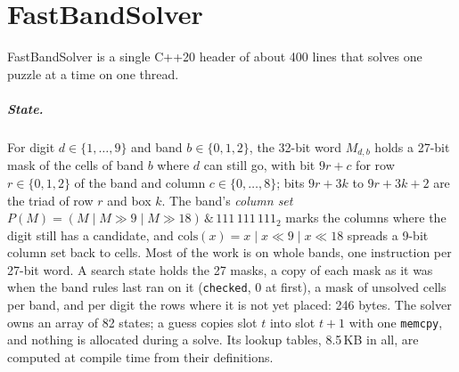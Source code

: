 \documentclass[a4paper,USenglish,cleveref,anonymous]{lipics-v2021}
\begin{document}
\section{FastBandSolver}
\label{sec:solver}

FastBandSolver is a single C++20 header of about 400 lines that solves one puzzle at a time on one thread.

\subparagraph{State.} For digit $d\in\{1,\dots,9\}$ and band $b\in\{0,1,2\}$, the 32-bit word $M_{d,b}$ holds a 27-bit
mask of the cells of band $b$ where $d$ can still go, with bit $9r+c$ for row $r\in\{0,1,2\}$ of the band and column
$c\in\{0,\dots,8\}$; bits $9r+3k$ to $9r+3k+2$ are the triad of row $r$ and box $k$. The band's \emph{column set}
$P(M)=(M \mid M\gg 9 \mid M\gg 18)\,\&\,111\,111\,111_2$ marks the columns where the digit still has a candidate, and
$\mathrm{cols}(x)=x \mid x\ll 9 \mid x\ll 18$ spreads a 9-bit column set back to cells. Most of the work is on whole
bands, one instruction per 27-bit word. A search state holds the 27 masks, a copy of each mask as it was when the band
rules last ran on it (\texttt{checked}, 0 at first), a mask of unsolved cells per band, and per digit the rows where
it is not yet placed: 246 bytes. The solver owns an array of 82 states; a guess copies slot $t$ into slot $t+1$ with
one \texttt{memcpy}, and nothing is allocated during a solve. Its lookup tables, 8.5\,KB in all, are computed at
compile time from their definitions.
\end{document}
